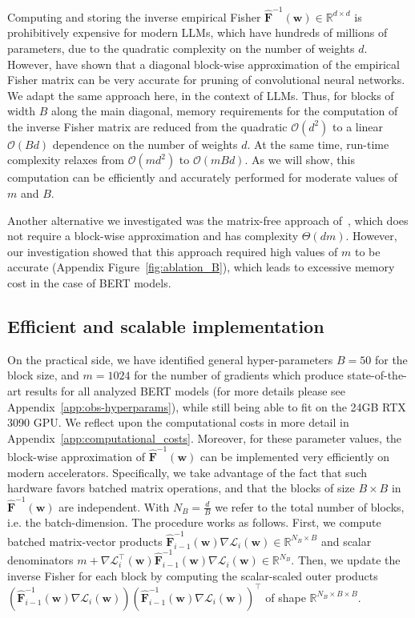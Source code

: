 \documentclass[11pt]{article}
\newcommand{\vect}[1]{\mathbf{#1}}
\newcommand{\w}{\mathbf{w}}
\newcommand{\pr}[1]{\left(#1\right)}
\newcommand{\eF}{\widehat{\vect{F}}}
\begin{document}
Computing and storing the inverse empirical Fisher $\eF^{-1}(\w) \in \mathbb{R}^{d \times d}$ is prohibitively expensive for modern LLMs, which have hundreds of millions of parameters, due to the quadratic complexity on the number of weights $d$. However, \citet{Singh2020WoodFisherES} have shown that a diagonal block-wise approximation of the empirical Fisher matrix can be very accurate for pruning of convolutional neural networks.  We adapt the same approach here, in the context of LLMs. Thus, for blocks of width $B$ along the main diagonal, memory requirements for the computation of the inverse Fisher matrix are reduced from the quadratic $\mathcal{O}(d^2)$ to a linear $\mathcal{O}(Bd)$ dependence on the number of weights $d$. At the same time, run-time complexity relaxes from $\mathcal{O}(md^2)$ to $\mathcal{O}(mBd)$. 
As we will show, this computation can be efficiently and accurately performed for moderate values of $m$ and $B$. 

{Another alternative we investigated was the matrix-free approach of~\citet{Frantar2021EfficientMA}, which does not require a block-wise approximation and has complexity $\Theta(dm)$. However, our investigation showed that this approach required high values of $m$ to be accurate (Appendix Figure~\ref{fig:ablation_B}), which leads to excessive memory cost in the case of BERT models.} 

\subsection{Efficient and scalable implementation}

On the practical side, we have identified general hyper-parameters $B = 50$ for the block size, and $m = 1024$ for the number of gradients which produce state-of-the-art results for all analyzed BERT models (for more details please see Appendix~\ref{app:obs-hyperparams}), while still being able to fit on the 24GB RTX 3090 GPU. We reflect upon the computational costs in more detail in Appendix~\ref{app:computational_costs}. 
Moreover, for these parameter values, the block-wise approximation of $\eF^{-1}(\w)$ can be implemented very efficiently on modern accelerators. Specifically, we take advantage of the fact that such hardware favors batched matrix operations, and that the blocks of size $B \times B$ in $\eF^{-1}(\w)$ are independent. With $N_B = \frac{d}{B}$ we refer to the total number of blocks, {i.e.} the batch-dimension. 
\noindent The procedure works as follows. First, we compute batched matrix-vector products $\eF^{-1}_{i-1}(\w) \nabla \mathcal{L}_i(\w) \in \mathbb{R}^{N_B \times B}$ and scalar denominators
$
m + \nabla \mathcal{L}^\top_i(\w) \eF^{-1}_{i-1}(\w) \nabla \mathcal{L}_i(\w) \in \mathbb{R}^{N_B}.
$
\noindent Then, we update the inverse Fisher for each block by computing the scalar-scaled outer products 
$
\pr{\eF^{-1}_{i-1}(\w) \nabla \mathcal{L}_i(\w)} \pr{\eF^{-1}_{i-1}(\w) \nabla \mathcal{L}_i(\w)}^\top
$
of shape $\mathbb{R}^{N_B \times B \times B}$.
\end{document}
